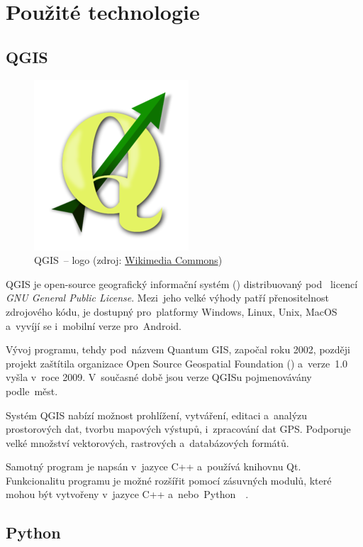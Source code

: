 \chapter{Použité technologie}
\label{technologie}

\section{QGIS}
\label{qgis}

	\begin{figure}[H] \centering
		\includegraphics[width=.3\textwidth]{./pictures/qgis_logo.png}
      	\caption[QGIS~– logo]{QGIS~– logo (zdroj:
\href{https://commons.wikimedia.org/wiki/File:QGis_Logo.png}{Wikimedia
Commons})}
		\label{fig:qgis_logo}
 	\end{figure}

QGIS je open-source geografický informační systém ()
distribuovaný pod ~licencí \textit{GNU General Public
License}. Mezi~jeho velké výhody patří přenositelnost zdrojového kódu,
je dostupný pro~platformy Windows, Linux, Unix, MacOS a~vyvíjí se
i~mobilní verze pro~Android.

Vývoj programu, tehdy pod~názvem Quantum GIS, započal roku 2002,
později projekt zaštítila organizace Open Source Geospatial Foundation
() a~verze~1.0 vyšla v~roce 2009. V~současné době jsou verze
QGISu pojmenovávány podle~měst.

Systém QGIS nabízí možnost prohlížení, vytváření, editaci a~analýzu
prostorových dat, tvorbu mapových výstupů, i~zpracování dat
GPS. Podporuje velké množství vektorových, rastrových a~databázových
formátů.

Samotný program je napsán v~jazyce C++ a~používá knihovnu
Qt. Funkcionalitu programu je možné rozšířit pomocí zásuvných modulů,
které mohou být vytvořeny v~jazyce C++
a~nebo~Python~\citep{qgis}~\citep{wiki_qgis}.

\section{Python}
\label{python}

